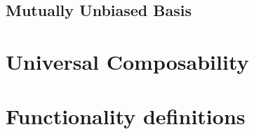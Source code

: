 \subsection{Mutually Unbiased Basis}




\section{Universal Composability}


\section{Functionality definitions}


%
%
%
